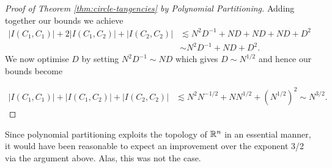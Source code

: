 \begin{proof}[Proof of Theorem \ref{thm:circle-tangencies} by Polynomial Partitioning]
Adding together our bounds we achieve
\begin{align*}
    |I(C_1,C_1)|+2|I(C_1,C_2)|+|I(C_2,C_2)| &\lesssim N^2D^{-1} + ND + ND + ND + D^2 \\
    &\sim N^2D^{-1} + ND + D^2.
\end{align*}
We now optimise $D$ by setting $N^2D^{-1} \sim ND$ which gives $D \sim N^{1/2}$ and hence our bounds become

\begin{align*}
    |I(C_1,C_1)|+|I(C_1,C_2)|+|I(C_2,C_2)| &\lesssim N^2N^{-1/2} + NN^{1/2} + (N^{1/2})^2 \sim N^{3/2}.
\end{align*}
\end{proof}
\begin{remark}
    Since polynomial partitioning exploits the topology of $\mathbb R^n$ in an essential manner, it would have been reasonable to expect an improvement over the exponent 3/2 via the argument above. Alas, this was not the case.
\end{remark}

